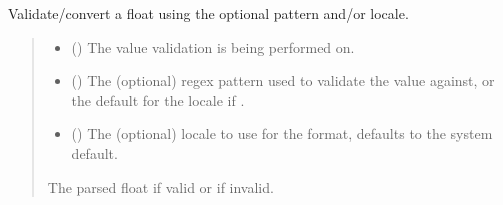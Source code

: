 \documentclass[letterpaper,10pt,english]{sphinxmanual}
\begin{document}
\begin{fulllineitems}
\begin{fulllineitems}
\begin{quote}
\begin{description}
\end{description}\end{quote}

\end{fulllineitems}


\begin{fulllineitems}
\label{\detokenize{apache_commons_validator_python.routines:apache_commons_validator_python.routines.float_validator.FloatValidator.validate}}
\pysigstartsignatures
{}
\pysigstopsignatures
\sphinxAtStartPar
Validate/convert a float using the optional pattern and/or locale.
\begin{quote}\begin{description}
\begin{itemize}
\item {} 
\sphinxAtStartPar
{} () \textendash{} The value validation is being performed on.

\item {} 
\sphinxAtStartPar
{} () \textendash{} The (optional) regex pattern used to validate the value against,
or the default for the locale if .

\item {} 
\sphinxAtStartPar
{} () \textendash{} The (optional) locale to use for the format, defaults to the system default.

\end{itemize}

\sphinxAtStartPar
The parsed float if valid or  if invalid.

\end{description}\end{quote}

\end{fulllineitems}


\end{fulllineitems}
\end{document}
